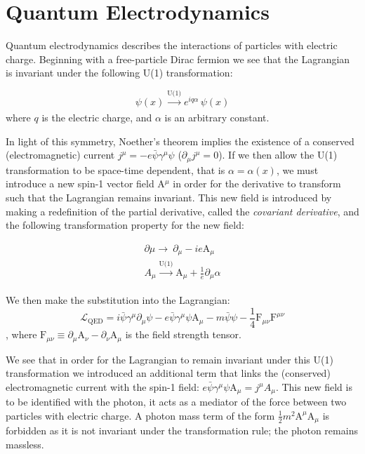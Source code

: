 \section{Quantum Electrodynamics}

Quantum electrodynamics describes the interactions of particles with electric charge. Beginning with a free-particle Dirac fermion we see that the Lagrangian is invariant under the following U(1) transformation:

\begin{equation}
\psi(x)  \xrightarrow[]{\text{U(1)}} e^{i q \alpha}\,\psi(x)
\label{eq:u1}
\end{equation}
where $q$ is the electric charge, and $\alpha$ is an arbitrary constant.

In light of this symmetry, Noether's theorem implies the existence of a conserved (electromagnetic) current $j^{\mu} = -e\bar{\psi}\gamma^{\mu}\psi$ ($\partial_{\mu}j^{\mu}=0$). If we then allow the U(1) transformation to be space-time dependent, that is $\alpha = \alpha(x)$, we must introduce a new spin-1 vector field A$^{\mu}$ in order for the derivative to transform such that the Lagrangian remains invariant. This new field is introduced by making a redefinition of the partial derivative, called the \textit{covariant derivative}, and the following transformation property for the new field:

\begin{equation}
\begin{array}{l}
\partial{\mu} \rightarrow\ \partial_{\mu} - ie\mathrm{A}_{\mu}
\\A_{\mu} \xrightarrow[]{\text{U(1)}} \mathrm{A}_{\mu} + \frac{1}{e} \partial_{\mu} \alpha
 \end{array}
\end{equation}

We then make the substitution into the Lagrangian:
\begin{equation}
\mathcal{L}_{\mathrm{QED}} =
i\bar{\psi}\gamma^{\mu}\partial_{\mu}\psi
- e\bar{\psi}\gamma^{\mu}\psi \mathrm{A}_{\mu}
- m\bar{\psi}\psi
- \frac{1}{4}\mathrm{F}_{\mu\nu} \mathrm{F}^{\mu\nu}
\end{equation},
where $\mathrm{F}_{\mu\nu}\equiv\partial_{\mu}\mathrm{A}_{\nu} - \partial_{\nu}\mathrm{A}_{\mu}$ is the field strength tensor.

We see that in order for the Lagrangian to remain invariant under this U(1) transformation we introduced an additional term that links the (conserved) electromagnetic current with the spin-1 field: $e\bar{\psi}\gamma^{\mu}\psi \mathrm{A}_{\mu} = j^{\mu}A_{\mu}$. This new field is to be identified with the photon, it acts as a mediator of the force between two particles with electric charge. A photon mass term of the form $\frac{1}{2}m^{2}\mathrm{A}^{\mu}\mathrm{A}_{\mu}$ is forbidden as it is not invariant under the transformation rule; the photon remains massless.

